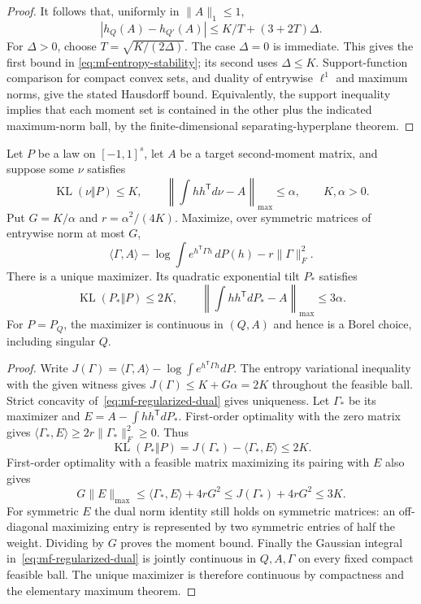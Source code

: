 \begin{proof}
It follows that, uniformly in $\|A\|_1\leq1$,
\[
 |h_Q(A)-h_{Q'}(A)|\leq K/T+(3+2T)\Delta.
\]
For $\Delta>0$, choose $T=\sqrt{K/(2\Delta)}$.
The case $\Delta=0$ is immediate.  This gives the first bound in
\eqref{eq:mf-entropy-stability}; its second uses $\Delta\leq K$.
Support-function comparison for compact convex sets, and duality of
entrywise $\ell^1$ and maximum norms, give the stated Hausdorff bound.
Equivalently, the support inequality implies that each moment set is
contained in the other plus the indicated maximum-norm ball, by the
finite-dimensional separating-hyperplane theorem.
\end{proof}

\begin{lemma}
\label{lem:mf-regularized-tilt}
Let $P$ be a law on $[-1,1]^s$, let $A$ be a target second-moment
matrix, and suppose some $\nu$ satisfies
\[
 \operatorname{KL}(\nu\Vert P)\leq K,
 \qquad\left\|\int hh^{\mathsf T}d\nu-A\right\|_{\max}\leq\alpha,
 \qquad K,\alpha>0.
\]
Put $G=K/\alpha$ and $r=\alpha^2/(4K)$.
Maximize, over symmetric matrices of entrywise norm at most $G$,
\begin{equation}
 \langle\Gamma,A\rangle-
   \log\int e^{h^{\mathsf T}\Gamma h}\,dP(h)-r\|\Gamma\|_F^2.
 \label{eq:mf-regularized-dual}
\end{equation}
There is a unique maximizer.  Its quadratic exponential tilt $P_*$
satisfies
\[
 \operatorname{KL}(P_*\Vert P)\leq2K,
 \qquad\left\|\int hh^{\mathsf T}dP_*-A\right\|_{\max}\leq3\alpha.
\]
For $P=P_Q$, the maximizer is continuous in $(Q,A)$ and hence is a
Borel choice, including singular $Q$.
\end{lemma}
\begin{proof}
Write $J(\Gamma)=\langle\Gamma,A\rangle-\log\int e^{h^{\mathsf T}\Gamma h}dP$.
The entropy variational inequality with the given witness gives
$J(\Gamma)\leq K+G\alpha=2K$ throughout the feasible ball.
Strict concavity of~\eqref{eq:mf-regularized-dual} gives uniqueness.
Let $\Gamma_*$ be its maximizer and
$E=A-\int hh^{\mathsf T}dP_*$.
First-order optimality with the zero matrix gives
$\langle\Gamma_*,E\rangle\geq2r\|\Gamma_*\|_F^2\geq0$.
Thus
\[
 \operatorname{KL}(P_*\Vert P)
       =J(\Gamma_*)-\langle\Gamma_*,E\rangle\leq2K.
\]
First-order optimality with a feasible matrix maximizing its pairing
with $E$ also gives
\[
 G\|E\|_{\max}
 \leq\langle\Gamma_*,E\rangle+4rG^2
 \leq J(\Gamma_*)+4rG^2\leq3K.
\]
For symmetric $E$ the dual norm identity still holds on symmetric
matrices: an off-diagonal maximizing entry is represented by two
symmetric entries of half the weight.  Dividing by $G$ proves the
moment bound.
Finally the Gaussian integral in~\eqref{eq:mf-regularized-dual} is
jointly continuous in $Q,A,\Gamma$ on every fixed compact feasible
ball.  The unique maximizer is therefore continuous by compactness
and the elementary maximum theorem.
\end{proof}

